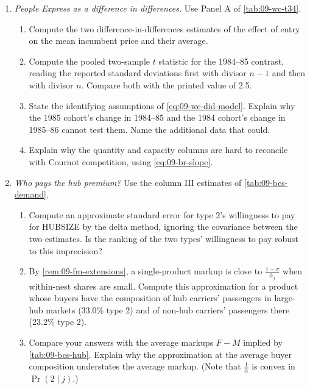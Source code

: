 \begin{enumerate}[label=\arabic*., leftmargin=*, itemsep=6pt]
\item \emph{People Express as a difference in differences.} Use Panel A of \cref{tab:09-wc-t34}.
\begin{enumerate}[label=(\alph*)]
\item Compute the two difference-in-differences estimates of the effect of entry on the mean incumbent price
and their average.
\item Compute the pooled two-sample $t$ statistic for the 1984--85 contrast, reading the reported standard
deviations first with divisor $n-1$ and then with divisor $n$. Compare both with the printed value of 2.5.
\item State the identifying assumptions of \eqref{eq:09-wc-did-model}. Explain why the 1985 cohort's
change in 1984--85 and the 1984 cohort's change in 1985--86 cannot test them. Name the additional data
that could.
\item Explain why the quantity and capacity columns are hard to reconcile with Cournot competition, using
\eqref{eq:09-br-slope}.
\end{enumerate}

\item \emph{Who pays the hub premium?} Use the column III estimates of \cref{tab:09-bcs-demand}.
\begin{enumerate}[label=(\alph*)]
\item Compute an approximate standard error for type 2's willingness to pay for HUBSIZE by the delta method,
ignoring the covariance between the two estimates. Is the ranking of the two types' willingness to pay
robust to this imprecision?
\item By \cref{rem:09-fm-extensions}, a single-product markup is close to $\frac{1-\sigma}{\bar\alpha_j}$
when within-nest shares are small. Compute this approximation for a product whose buyers have the
composition of hub carriers' passengers in large-hub markets (33.0\% type 2) and of non-hub carriers'
passengers there (23.2\% type 2).
\item Compare your answers with the average markups $F-M$ implied by \cref{tab:09-bcs-hub}. Explain why
the approximation at the average buyer composition understates the average markup. (Note that $\frac{1}{\bar\alpha}$
is convex in $\Pr(2\mid j)$.)
\end{enumerate}


\end{enumerate}
